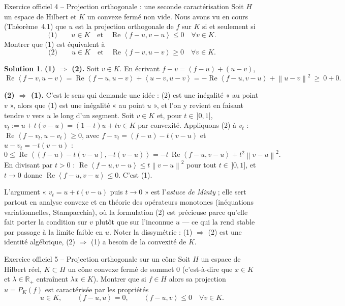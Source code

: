 \documentclass[11pt,a4paper]{article}
\newcommand{\R}{\mathbb{R}}
\newcommand{\norm}[1]{\left\|#1\right\|}
\newcommand{\ps}[2]{\left\langle #1,#2\right\rangle}
\renewcommand{\Re}{\operatorname{Re}}
\theoremstyle{definition}
\newtheorem*{solution}{Solution}
\begin{document}
\begin{exo}{Exercice officiel 4 -- Projection orthogonale : une seconde caractérisation}
Soit $H$ un espace de Hilbert et $K$ un convexe fermé non vide. Nous avons vu en cours (Théorème~4.1) que $u$ est la projection orthogonale de $f$ sur $K$ si et seulement si
\[
\text{(1)}\qquad u\in K\quad\text{et}\quad\Re\ps{f-u}{v-u}\le0\quad\forall v\in K .
\]
Montrer que (1) est équivalent à
\[
\text{(2)}\qquad u\in K\quad\text{et}\quad\Re\ps{f-v}{u-v}\ge0\quad\forall v\in K .
\]
\end{exo}

\begin{solution}
\noindent\textbf{(1) $\Rightarrow$ (2).} Soit $v\in K$. En écrivant $f-v=(f-u)+(u-v)$,
\[
\Re\ps{f-v}{u-v}=\Re\ps{f-u}{u-v}+\ps{u-v}{u-v}=-\Re\ps{f-u}{v-u}+\norm{u-v}^2\ \ge\ 0+0 .
\]

\medskip
\noindent\textbf{(2) $\Rightarrow$ (1).} C'est le sens qui demande une idée : (2) est une inégalité « au point $v$ », alors que (1) est une inégalité « au point $u$ », et l'on y revient en faisant tendre $v$ vers $u$ le long d'un segment. Soit $v\in K$ et, pour $t\in\,]0,1]$, $v_t:=u+t(v-u)=(1-t)u+tv\in K$ par convexité. Appliquons (2) à $v_t$ : $\Re\ps{f-v_t}{u-v_t}\ge0$, avec $f-v_t=(f-u)-t(v-u)$ et $u-v_t=-t(v-u)$ :
\[
0\le\Re\ps{(f-u)-t(v-u)}{-t(v-u)}=-t\,\Re\ps{f-u}{v-u}+t^2\norm{v-u}^2 .
\]
En divisant par $t>0$ : $\Re\ps{f-u}{v-u}\le t\norm{v-u}^2$ pour tout $t\in\,]0,1]$, et $t\to0$ donne $\Re\ps{f-u}{v-u}\le0$. C'est (1).
\end{solution}

\begin{commentaire}
L'argument « $v_t=u+t(v-u)$ puis $t\to0$ » est l'\emph{astuce de Minty} ; elle sert partout en analyse convexe et en théorie des opérateurs monotones (inéquations variationnelles, Stampacchia), où la formulation (2) est précieuse parce qu'elle fait porter la condition sur $v$ plutôt que sur l'inconnue $u$ — ce qui la rend stable par passage à la limite faible en $u$. Noter la dissymétrie : (1) $\Rightarrow$ (2) est une identité algébrique, (2) $\Rightarrow$ (1) a besoin de la convexité de $K$.
\end{commentaire}

\begin{exo}{Exercice officiel 5 -- Projection orthogonale sur un cône}
Soit $H$ un espace de Hilbert réel, $K\subset H$ un cône convexe fermé de sommet $0$ (c'est-à-dire que $x\in K$ et $\lambda\in\R_+$ entraînent $\lambda x\in K$). Montrer que si $f\in H$ alors sa projection $u=P_K(f)$ est caractérisée par les propriétés
\[
u\in K,\qquad\ps{f-u}u=0,\qquad\ps{f-u}v\le0\quad\forall v\in K .
\]
\end{exo}
\end{document}
